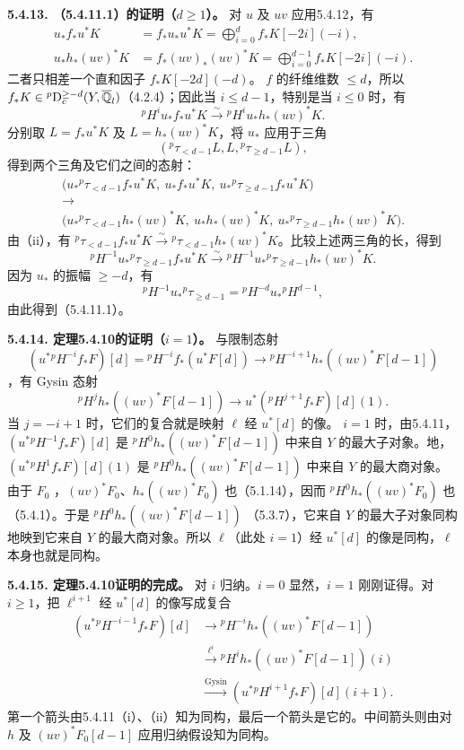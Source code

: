 \par\medskip\noindent\textbf{5.4.13. （5.4.11.1）的证明（$d\ge1$）。} 对 $u$ 及 $uv$ 应用5.4.12，有
\begin{align*}
u_*f_*u^*K&=f_*u_*u^*K=\bigoplus_{i=0}^df_*K[-2i](-i),\\
u_*h_*(uv)^*K&=f_*(uv)_*(uv)^*K=\bigoplus_{i=0}^{d-1}f_*K[-2i](-i).
\end{align*}
二者只相差一个直和因子 $f_*K[-2d](-d)$。
$f$ 的纤维维数 $\le d$，所以 $f_*K\in{}^p\mathrm{D}_c^{\ge-d}(Y,\overline{\mathbb Q}_l)$（4.2.4）；因此当 $i\le d-1$，特别是当 $i\le0$ 时，有
\[
{}^pH^iu_*f_*u^*K\xrightarrow{\sim}{}^pH^iu_*h_*(uv)^*K.
\]
分别取 $L=f_*u^*K$ 及 $L=h_*(uv)^*K$，将 $u_*$ 应用于三角
\[
({}^p\tau_{<d-1}L,L,{}^p\tau_{\ge d-1}L),
\]
得到两个三角及它们之间的态射：
\[
\begin{gathered}
\bigl(u_*{}^p\tau_{<d-1}f_*u^*K,\ u_*f_*u^*K,\ u_*{}^p\tau_{\ge d-1}f_*u^*K\bigr)\\
\longrightarrow\\
\bigl(u_*{}^p\tau_{<d-1}h_*(uv)^*K,\ u_*h_*(uv)^*K,\ u_*{}^p\tau_{\ge d-1}h_*(uv)^*K\bigr).
\end{gathered}
\]
由（ii），有 ${}^p\tau_{<d-1}f_*u^*K\xrightarrow{\sim}{}^p\tau_{<d-1}h_*(uv)^*K$。比较上述两三角的长，得到
\[
{}^pH^{-1}u_*{}^p\tau_{\ge d-1}f_*u^*K\xrightarrow{\sim}{}^pH^{-1}u_*{}^p\tau_{\ge d-1}h_*(uv)^*K.
\]
因为 $u_*$ 的振幅 $\ge-d$，有
\[
{}^pH^{-1}u_*{}^p\tau_{\ge d-1}={}^pH^{-d}u_*{}^pH^{d-1},
\]
由此得到（5.4.11.1）。
\par\medskip\noindent\textbf{5.4.14. 定理5.4.10的证明（$i=1$）。}
与限制态射
\[
(u^*{}^pH^{-i}f_*F)[d]={}^pH^{-i}f_*(u^*F[d])
\longrightarrow{}^pH^{-i+1}h_*((uv)^*F[d-1])
\]
，有 Gysin 态射
\[
{}^pH^jh_*((uv)^*F[d-1])\longrightarrow u^*({}^pH^{j+1}f_*F)[d](1).
\]
当 $j=-i+1$ 时，它们的复合就是映射 $\ell$ 经 $u^*[d]$ 的像。
$i=1$ 时，由5.4.11，$(u^*{}^pH^{-1}f_*F)[d]$ 是 ${}^pH^0h_*((uv)^*F[d-1])$ 中来自 $Y$ 的最大子对象。地，$(u^*{}^pH^1f_*F)[d](1)$ 是 ${}^pH^0h_*((uv)^*F[d-1])$ 中来自 $Y$ 的最大商对象。由于 $F_0$ ，$(uv)^*F_0$、$h_*((uv)^*F_0)$ 也（5.1.14），因而 ${}^pH^0h_*((uv)^*F_0)$ 也（5.4.1）。于是 ${}^pH^0h_*((uv)^*F[d-1])$ （5.3.7），它来自 $Y$ 的最大子对象同构地映到它来自 $Y$ 的最大商对象。所以 $\ell$（此处 $i=1$）经 $u^*[d]$ 的像是同构，$\ell$ 本身也就是同构。

\par\medskip\noindent\textbf{5.4.15. 定理5.4.10证明的完成。} 对 $i$ 归纳。$i=0$ 显然，$i=1$ 刚刚证得。对 $i\ge1$，把 $\ell^{i+1}$ 经 $u^*[d]$ 的像写成复合
\[
\begin{aligned}
(u^*{}^pH^{-i-1}f_*F)[d]
&\longrightarrow{}^pH^{-i}h_*((uv)^*F[d-1])\\
&\xrightarrow{\ell^i}{}^pH^ih_*((uv)^*F[d-1])(i)\\
&\xrightarrow{\mathrm{Gysin}}(u^*{}^pH^{i+1}f_*F)[d](i+1).
\end{aligned}
\]
第一个箭头由5.4.11（i）、（ii）知为同构，最后一个箭头是它的。中间箭头则由对 $h$ 及 $(uv)^*F_0[d-1]$ 应用归纳假设知为同构。
